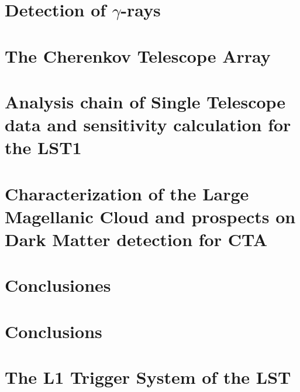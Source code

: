 \documentclass[12pt,fleqn]{book} %
\begin{document}

\chapter{Detection of $\gamma$-rays}
 \label{cap:detection}


\chapter{The Cherenkov Telescope Array} \label{cap:CTA}




\chapter[Analysis chain of Single Telescope data and sensitivity calculation for the LST1]{Analysis chain of Single Telescope data and sensitivity calculation for the LST1} \label{cap:LST1}



\chapter[Characterization of the Large Magellanic Cloud at TeV energies and prospects on Dark Matter detection for CTA]{Characterization of the Large Magellanic Cloud and prospects on Dark Matter detection for CTA}
\label{cap:LMC}



\newpage
\chapter[Conclusiones]{Conclusiones}


\newpage
\chapter[Conclusions]{Conclusions}


\appendix
{} %
\chapter[The L1 Trigger System of the LST1]{The L1 Trigger System of the LST}
\label{app:trigger}

\end{document}
